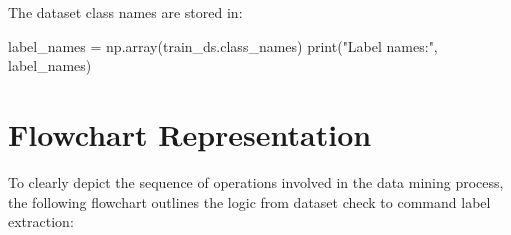 \bigskip



The dataset class names are stored in:

\medskip

{
  \begin{Python}
    label_names = np.array(train_ds.class_names)
    print("Label names:", label_names)
  \end{Python}
}


\bigskip



\section{Flowchart Representation}



To clearly depict the sequence of operations involved in the data mining process, the following flowchart outlines the logic from dataset check to command label extraction:



